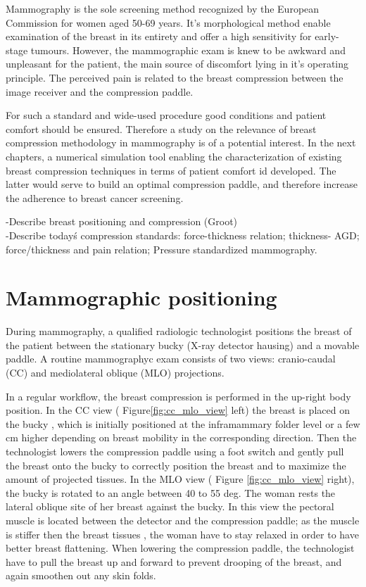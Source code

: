 

Mammography is the sole screening method recognized by the European Commission for women aged 50-69 years. It's morphological method enable examination of the breast in its entirety and offer a high sensitivity for early-stage tumours. However, the mammographic exam is knew to be awkward and  unpleasant for the patient,  the main source of discomfort lying in it's operating principle. The perceived pain is related to the breast compression between the image receiver and the compression paddle.

For such a standard and wide-used procedure good conditions and patient comfort should be ensured. Therefore a study on the relevance of breast compression methodology in mammography is of a potential interest. In the next chapters, a numerical simulation tool enabling the characterization of existing breast compression techniques in terms of patient comfort id developed. 
 The latter would serve to build an optimal compression paddle, and therefore increase the adherence to breast cancer screening. 




{\color{darkblue}
-Describe breast positioning and compression (Groot) \\
-Describe today\'s  compression standards: force-thickness relation; thickness- AGD; force/thickness and pain relation;  Pressure standardized mammography.}

\clearpage 
\section{Mammographic positioning} \label{subsec:mammographicpositioning}

During mammography, a qualified radiologic technologist positions the breast of the patient between the stationary bucky (X-ray detector hausing) and a movable paddle. A routine mammographyc exam consists of two views: cranio-caudal (CC) and mediolateral oblique (MLO) projections.  

In a regular workflow, the breast compression is performed in the up-right body position. In the CC view ( Figure\ref{fig:cc_mlo_view} left) the breast is placed on the bucky , which is initially positioned at the inframammary folder level or a few cm higher depending on breast mobility in the corresponding direction. Then the technologist lowers the compression paddle using a foot switch and gently pull the breast onto the bucky to correctly position the breast and to maximize the amount of projected tissues. In the MLO view ( Figure \ref{fig:cc_mlo_view} right), the bucky is rotated to an angle between 40 to 55 deg. The woman rests the lateral oblique site of her breast against the bucky. In this view the pectoral muscle is located between the detector and the compression paddle; as the muscle is stiffer then the breast tissues , the woman have to stay relaxed in order to have better breast flattening. When lowering the compression paddle, the technologist have to pull the breast up and forward to prevent drooping of the breast, and again smoothen out any skin folds. 


